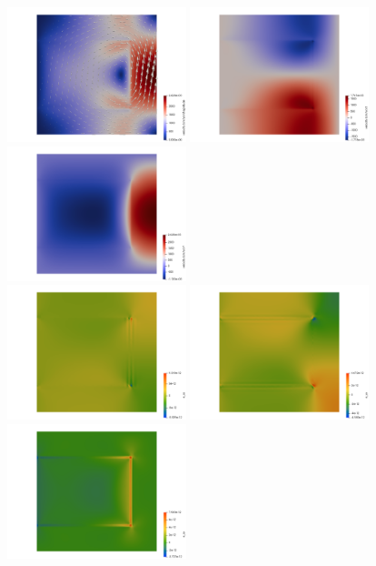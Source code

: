 \begin{center}
\includegraphics[width=5.2cm]{python_codes/fieldstone_64/results/slab/init/vel}
\includegraphics[width=5.2cm]{python_codes/fieldstone_64/results/slab/init/u}
\includegraphics[width=5.2cm]{python_codes/fieldstone_64/results/slab/init/v}\\
\includegraphics[width=5.2cm]{python_codes/fieldstone_64/results/slab/init/exx}
\includegraphics[width=5.2cm]{python_codes/fieldstone_64/results/slab/init/eyy}
\includegraphics[width=5.2cm]{python_codes/fieldstone_64/results/slab/init/exy}\\

\end{center}
